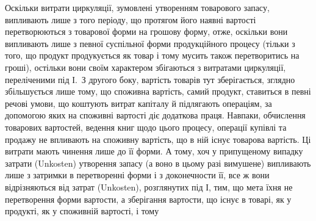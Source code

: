 Оскільки витрати циркуляції, зумовлені утворенням товарового запасу,
випливають лише з того періоду, що протягом його наявні вартості
перетворюються з товарової форми на грошову форму, отже, оскільки
вони випливають лише з певної суспільної форми продукційного процесу
(тільки з того, що продукт продукується як товар і тому мусить також
перетворитись на гроші), остільки вони своїм характером збігаються з витратами
циркуляції, переліченими під І.~З другого боку, вартість товарів тут зберігається,
зглядно збільшується лише тому, що споживна вартість, самий
продукт, ставиться в певні речові умови, що коштують витрат капіталу й
підлягають операціям, за допомогою яких на споживні вартості діє
додаткова праця. Навпаки, обчислення товарових вартостей, ведення книг
щодо цього процесу, операції купівлі та продажу не впливають на споживну
вартість, що в ній існує товарова вартість. Ці витрати мають
чинення лише до її форми. А тому, хоч у припущеному випадку
затрати (Unkosten) утворення запасу (а воно в цьому разі вимушене)
випливають лише з затримки в перетворенні форми і з доконечности її,
все ж вони відрізняються від затрат (Unkosten), розглянутих під І, тим,
що мета їхня не перетворення форми вартости, а зберігання вартости,
що існує в товарі, як у продукті, як у споживній вартості, і тому
\parbreak{}  %
